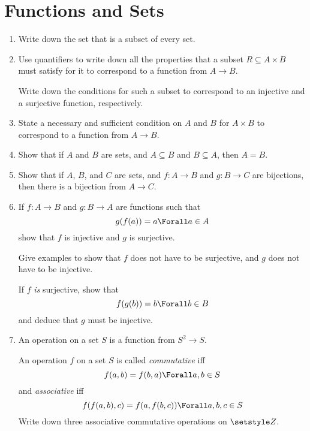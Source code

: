 \section{Functions and Sets}

\begin{enumerate}
 \item
  Write down the set that is a subset of every set.
 \item
  Use quantifiers to write down all the properties that a subset
  \(R \subseteq A \times B\) must satisfy for it to correspond to a function
  from \(A \to B\).

  Write down the conditions for such a subset to correspond to an injective and
  a surjective function, respectively.
 \item
  State a necessary and sufficient condition on \(A\) and \(B\) for
  \(A \times B\) to correspond to a function from \(A \to B\).
 \item
  Show that if \(A\) and \(B\) are sets, and \(A \subseteq B\) and
  \(B \subseteq A\), then \(A = B\).
 \item
  Show that if \(A\), \(B\), and \(C\) are sets, and
  \(f : A \to B\) and \(g : B \to C\) are bijections, then there is a bijection
  from \(A \to C\).
 \item
  If \(f: A \to B\) and \(g: B \to A\) are functions such that
  \begin{equation*}
   g(f(a)) = a \Forall a \in A
  \end{equation*}
  show that \(f\) is injective and \(g\) is surjective.

  Give examples to show that \(f\) does not have to be surjective, and \(g\)
  does not have to be injective.

  If \(f\) \emph{is} surjective, show that
  \begin{equation*}
   f(g(b)) = b \Forall b \in B
  \end{equation*}
  and deduce that \(g\) must be injective.
 \item
  An operation on a set \(S\) is a function from \(S^2 \to S\).

  An operation \(f\) on a set \(S\) is called \emph{commutative} iff
  \begin{equation*}
   f(a, b) = f(b, a) \Forall a, b \in S
  \end{equation*}
  and \emph{associative} iff
  \begin{equation*}
   f(f(a, b), c) = f(a, f(b, c)) \Forall a, b, c \in S
  \end{equation*}
  Write down three associative commutative operations on \(\Integers\).


\end{enumerate}
